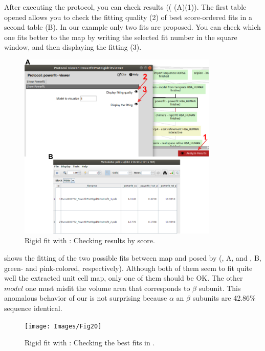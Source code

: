  After executing the  protocol, you can check results (( (A)(1)). The first table opened allows you to check the fitting quality (2) of best score-ordered fits in a second table (B). In our example only two fits are proposed. You can check which one fits better to the map by writing the selected fit number in the  square window, and then displaying the fitting (3).
 
 \begin{figure}[H]
  \centering 
  \captionsetup{width=.7\linewidth} 
  \includegraphics[width=0.85\textwidth]{Images/Fig19}
  \caption{Rigid fit with \powerfit: Checking results by score.}
  \label{fig:powerfit_results_table}
  \end{figure}
  
   shows the fitting of the two possible fits between map and  posed by \powerfit (, A, and , B, green- and pink-colored, respectively). Although both of them seem to fit quite well the extracted unit cell map, only one of them should be OK. The other $model$ one must misfit the volume area that corresponds to  $\beta$ subunit. This anomalous behavior of our  is not surprising because  $\alpha$ an $\beta$ subunits are 42.86\% sequence identical. 
  
 \begin{figure}[H]
  \centering 
  \captionsetup{width=.7\linewidth} 
  \texttt{[image: Images/Fig20]}
  \caption{Rigid fit with \powerfit: Checking the best fits in \chimera.}
  \label{fig:powerfit_results_figs}
  \end{figure}
  
